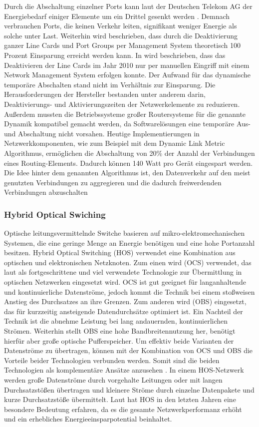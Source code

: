 Durch die Abschaltung einzelner Ports kann laut der Deutschen Telekom AG der Energiebedarf einiger Elemente um ein Drittel gesenkt werden \cite[4]{lange}. Demnach verbrauchen Ports, die keinen Verkehr leiten, signifikant weniger Energie als solche unter Last. Weiterhin wird beschrieben, dass durch die Deaktivierung ganzer Line Cards und Port Groups per Management System theoretisch 100 Prozent Einsparung erreicht werden kann. In  \cite{lange} wird beschrieben, dass das Deaktivieren der Line Cards im Jahr 2010 nur per manuellen Eingriff mit einem Network Management System erfolgen konnte. Der Aufwand für das dynamische temporäre Abschalten stand  nicht im Verhältnis zur Einsparung. Die Herausforderungen der Hersteller bestanden unter anderem darin, Deaktivierungs- und Aktivierungszeiten der Netzwerkelemente zu reduzieren. Außerdem mussten die Betriebssysteme großer Routersysteme für die genannte Dynamik kompatibel gemacht werden, da Softwarelösungen eine temporäre Aus- und Abschaltung nicht vorsahen.
Heutige Implementierungen in Netzwerkkomponenten, wie zum Beispiel mit dem Dynamic Link Metric Algorithmus, ermöglichen die Abschaltung von 20\% der Anzahl der Verbindungen eines Routing-Elements. Dadurch können 140 Watt pro Gerät eingespart werden\cite{keiouniversity}. Die Idee hinter dem genannten Algorithmus ist, den Datenverkehr auf den meist genutzten Verbindungen zu aggregieren und die dadurch freiwerdenden Verbindungen abzuschalten\cite[592]{survey2013} 


\subsubsection{Hybrid Optical Swiching}
Optische leitungsvermittelnde Switche basieren auf mikro-elektromechanischen Systemen, die eine geringe Menge an Energie benötigen und eine hohe Portanzahl besitzen. Hybrid Optical Switching (HOS) verwendet eine Kombination aus optischen und elektronischen Netzknoten. Zum einen wird  (OCS) verwendet, das laut \textcite{tsinghua2011} als fortgeschrittene und viel verwendete Technologie zur Übermittlung in optischen Netzwerken eingesetzt wird. OCS ist gut geeignet für langanhaltende und kontinuierliche Datenströme, jedoch kommt die Technik bei einem stoßweisen Anstieg des Durchsatzes an ihre Grenzen. Zum anderen wird  (OBS) eingesetzt, das für kurzzeitig ansteigende Datendurchsätze optimiert ist. Ein Nachteil der Technik ist die abnehme Leistung bei lang andauernden, kontinuierlichen Strömen. Weiterhin stellt OBS eine hohe Bandbreitennutzung her, benötigt hierfür aber große optische Pufferspeicher. Um effektiv beide Varianten der Datenströme zu übertragen, können mit der Kombination von OCS und OBS die Vorteile beider Technologien verbunden werden. Somit sind die beiden Technologien als komplementäre Ansätze anzusehen \cite{tsinghua2011}. In einem HOS-Netzwerk werden große Datenströme durch vorgehalte Leitungen oder mit langen Durchsatzstößen übertragen und kleinere Ströme durch einzelne Datenpakete und kurze Durchsatzstöße übermittelt. Laut \textcite{adaptiveHOS} hat HOS in den letzten Jahren eine besondere Bedeutung erfahren, da es die gesamte Netzwerkperformanz erhöht und ein erhebliches Energieeinsparpotential beinhaltet.

